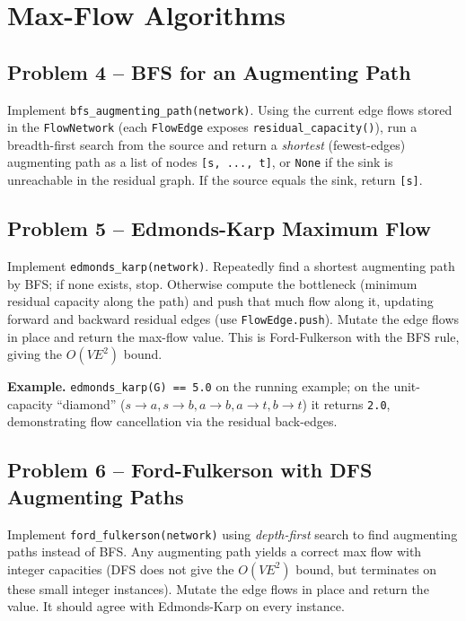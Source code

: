 \documentclass[11pt]{article}
\begin{document}
\newpage
\section{Max-Flow Algorithms}

\subsection*{Problem 4 -- BFS for an Augmenting Path}

Implement \texttt{bfs\_augmenting\_path(network)}. Using the current edge flows stored in
the \texttt{FlowNetwork} (each \texttt{FlowEdge} exposes \texttt{residual\_capacity()}),
run a breadth-first search from the source and return a \emph{shortest} (fewest-edges)
augmenting path as a list of nodes \texttt{[s, ..., t]}, or \texttt{None} if the sink is
unreachable in the residual graph. If the source equals the sink, return \texttt{[s]}.

\subsection*{Problem 5 -- Edmonds-Karp Maximum Flow}

Implement \texttt{edmonds\_karp(network)}. Repeatedly find a shortest augmenting path by
BFS; if none exists, stop. Otherwise compute the bottleneck (minimum residual capacity
along the path) and push that much flow along it, updating forward and backward residual
edges (use \texttt{FlowEdge.push}). Mutate the edge flows in place and return the max-flow
value. This is Ford-Fulkerson with the BFS rule, giving the $O(VE^2)$ bound.

\textbf{Example.} \texttt{edmonds\_karp(G) == 5.0} on the running example; on the
unit-capacity ``diamond'' ($s\!\to\!a,s\!\to\!b,a\!\to\!b,a\!\to\!t,b\!\to\!t$) it returns
\texttt{2.0}, demonstrating flow cancellation via the residual back-edges.

\subsection*{Problem 6 -- Ford-Fulkerson with DFS Augmenting Paths}

Implement \texttt{ford\_fulkerson(network)} using \emph{depth-first} search to find
augmenting paths instead of BFS. Any augmenting path yields a correct max flow with integer
capacities (DFS does not give the $O(VE^2)$ bound, but terminates on these small integer
instances). Mutate the edge flows in place and return the value. It should agree with
Edmonds-Karp on every instance.
\end{document}
